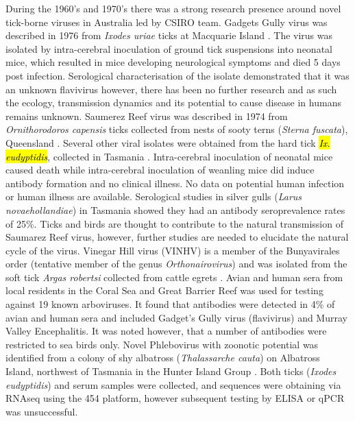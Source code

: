 \documentclass[a4paper, nobind]{templates/ociamthesis}
\begin{document}
During the 1960's and 1970's there was a strong research presence around novel tick-borne viruses in Australia led by CSIRO team.
Gadgets Gully virus was described in 1976 from \emph{Ixodes uriae} ticks at Macquarie Island \autocite{st.georgeIsolationArbovirusesIncluding1985}.
The virus was isolated by intra-cerebral inoculation of ground tick suspensions into neonatal mice, which resulted in mice developing neurological symptoms and died 5 days post infection.
Serological characterisation of the isolate demonstrated that it was an unknown flavivirus however, there has been no further research and as such the ecology, transmission dynamics and its potential to cause disease in humans remains unknown.
Saumerez Reef virus was described in 1974 from \emph{Ornithorodoros capensis} ticks collected from nests of sooty terns (\emph{Sterna fuscata}), Queensland \autocite{st.georgeIsolationSaumarezReef1977}.
Several other viral isolates were obtained from the hard tick \hl{\emph{Ix. eudyptidis}}, collected in Tasmania \autocite{st.georgeIsolationSaumarezReef1977}.
Intra-cerebral inoculation of neonatal mice caused death while intra-cerebral inoculation of weanling mice did induce antibody formation and no clinical illness.
No data on potential human infection or human illness are available.
Serological studies in silver gulls (\emph{Larus novaehollandiae}) in Tasmania showed they had an antibody seroprevalence rates of 25\%. Ticks and birds are thought to contribute to the natural transmission of Saumarez Reef virus, however, further studies are needed to elucidate the natural cycle of the virus.
Vinegar Hill virus (VINHV) is a member of the Bunyavirales order (tentative member of the genus \emph{Orthonairovirus}) and was isolated from the soft tick \emph{Argas robertsi} collected from cattle egrets \autocite{gauciGenomicCharacterisationVinegar2017}.
Avian and human sera from local residents in the Coral Sea and Great Barrier Reef was used for testing against 19 known arboviruses.
It found that antibodies were detected in 4\% of avian and human sera and included Gadget's Gully virus (flavivirus) and Murray Valley Encephalitis.
It was noted however, that a number of antibodies were restricted to sea birds only.
Novel Phlebovirus with zoonotic potential was identified from a colony of shy albatross (\emph{Thalassarche cauta}) on Albatross Island, northwest of Tasmania in the Hunter Island Group \autocite{wangNovelPhlebovirusZoonotic2014}.
Both ticks (\emph{Ixodes eudyptidis}) and serum samples were collected, and sequences were obtaining via RNAseq using the 454 platform, however subsequent testing by ELISA or qPCR was unsuccessful.
\end{document}
